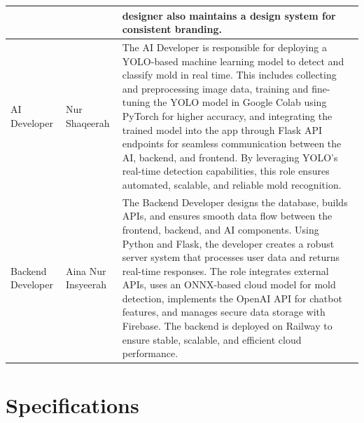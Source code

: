 \documentclass[conference]{IEEEtran}
\begin{document}
\begin{table}[h]
\centering
\setlength{\tabcolsep}{12pt}
\renewcommand{\arraystretch}{1.5}
\begin{tabular}{|p{1cm}|p{1.5cm}|p{4cm}|}
\hline
&& designer also maintains a design system for consistent branding.\\
\hline
AI Developer & Nur Shaqeerah & The AI Developer is responsible for deploying a YOLO-based machine learning model to detect and classify mold in real time. This includes collecting and preprocessing image data, training and fine-tuning the YOLO model in Google Colab using PyTorch for higher accuracy, and integrating the trained model into the app through Flask API endpoints for seamless communication between the AI, backend, and frontend. By leveraging YOLO’s real-time detection capabilities, this role ensures automated, scalable, and reliable mold recognition.\\
\hline

Backend Developer & Aina Nur \newline Insyeerah & The Backend Developer designs the database, builds APIs, and ensures smooth data flow between the frontend, backend, and AI components. Using Python and Flask, the developer creates a robust server system that processes user data and returns real-time responses. The role integrates external APIs, uses an ONNX-based cloud model for mold detection, implements the OpenAI API for chatbot features, and manages secure data storage with Firebase. The backend is deployed on Railway to ensure stable, scalable, and efficient cloud performance. \\
\hline

\end{tabular}
\end{table}

 \newpage

\section{Specifications}
\end{document}
